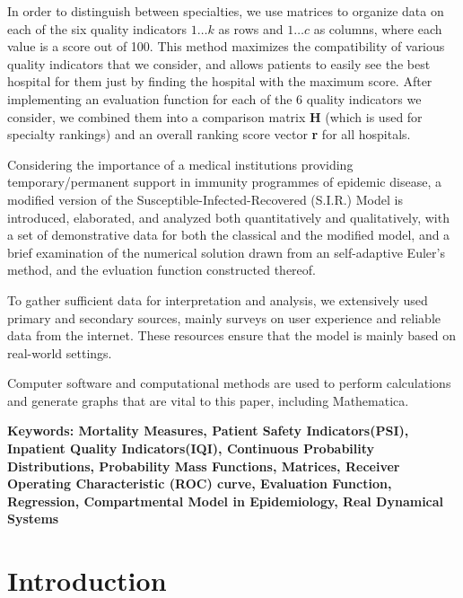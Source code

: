 \documentclass{article}
\begin{document}
In order to distinguish between specialties, we use matrices to organize data on each of the six quality indicators $1 \dots k$ as rows and $1 \dots c$ as columns, where each value is a score out of 100. This method maximizes the compatibility of various quality indicators that we consider, and allows patients to easily see the best hospital for them just by finding the hospital with the maximum score. After implementing an evaluation function for each of the 6 quality indicators we consider, we combined them into a comparison matrix \textbf{H} (which is used for specialty rankings) and an overall ranking score vector \textbf{r} for all hospitals.

Considering the importance of a medical institutions providing temporary/permanent support in immunity programmes of epidemic disease, a modified version of the Susceptible-Infected-Recovered (S.I.R.) Model is introduced, elaborated, and analyzed both quantitatively and qualitatively, with a set of demonstrative data for both the classical and the modified model, and a brief examination of the numerical solution drawn from an self-adaptive Euler's method, and the evluation function constructed thereof.

To gather sufficient data for interpretation and analysis, we extensively used primary and secondary sources, mainly surveys on user experience and reliable data from the internet. These resources ensure that the model is mainly based on real-world settings.

Computer software and computational methods are used to perform calculations and generate graphs that are vital to this paper, including Mathematica.

\textbf{Keywords: Mortality Measures, Patient Safety Indicators(PSI), Inpatient Quality Indicators(IQI), Continuous Probability Distributions, Probability Mass Functions, Matrices, Receiver Operating Characteristic (ROC) curve, Evaluation Function, Regression, Compartmental Model in Epidemiology, Real Dynamical Systems}

\newpage

\tableofcontents

\pagestyle{fancy}
\fancyhf{}

\newpage
\section{Introduction}
\end{document}
